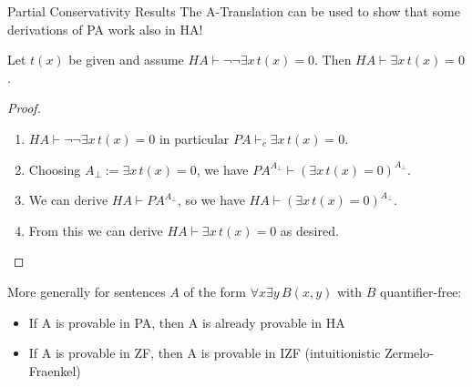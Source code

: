 \documentclass[xcolor=dvipsnames,aspectratio=169,handout]{beamer}
\begin{document}
\begin{frame}{Partial Conservativity Results}
	\pause
	The A-Translation can be used to show that some derivations of PA work also in HA!
	
	\pause
	\begin{theorem}
		Let $t(x)$ be given and assume $HA\vdash \neg \neg \exists x \, t(x)= 0$.
		Then $HA\vdash \exists x\, t(x)= 0$.
	\end{theorem}
	\pause
	\vspace{-0.3cm}
	\begin{proof}
		\begin{enumerate}
			\pause
			\item
			$HA\vdash \neg \neg \exists x \, t(x)= 0$ in particular $PA\vdash_c \exists x \, t(x)= 0$.
			\pause
			\item
			Choosing $A_\bot:= \exists x \, t(x)= 0$, we have $PA^{A_\bot}\vdash (\exists x \, t(x)= 0)^{A_\bot}$.
			\pause
			\item
			We can derive $HA\vdash PA^{A_\bot}$, so we have $HA\vdash (\exists x \, t(x)= 0)^{A_\bot}$.
			\pause
			\item
			From this we can derive $HA\vdash \exists x\, t(x)= 0$ as desired.
			\qedhere
		\end{enumerate}
	\end{proof}
	
	\pause
	\vspace{0.5cm}
	More generally for sentences $A$ of the form $\forall x \exists y\,B(x,y)$ with $B$ quantifier-free:
	\begin{itemize}
		\pause
		\item
		If A is provable in PA, then A is already provable in HA
		\pause
		\item
		If A is provable in ZF, then A is provable in IZF (intuitionistic Zermelo-Fraenkel)
	\end{itemize}
\end{frame}
\end{document}

